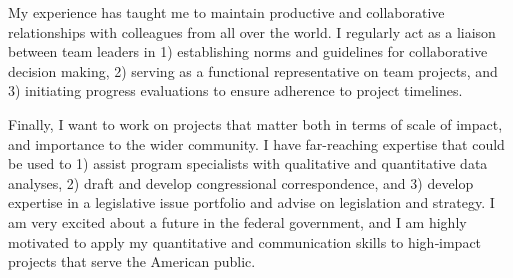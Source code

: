 \documentclass[11pt, a4paper]{maedbh-cv}
\begin{document}
\begin{cvletter}
	My experience has taught me to maintain productive and collaborative relationships with colleagues from all over the world. I regularly act as a liaison between team leaders in 1) establishing norms and guidelines for collaborative decision making, 2) serving as a functional representative on team projects, and 3) initiating progress evaluations to ensure adherence to project timelines.  

	Finally, I want to work on projects that matter both in terms of scale of impact, and importance to the wider community. I have far-reaching expertise that could be used to 1) assist program specialists with qualitative and quantitative data analyses, 2) draft and develop congressional correspondence, and 3) develop expertise in a legislative issue portfolio and advise on legislation and strategy. I am very excited about a future in the federal government, and I am highly motivated to apply my quantitative and communication skills to high‐impact projects that serve the American public. 

\end{cvletter}

\makeletterclosing
\end{document}
